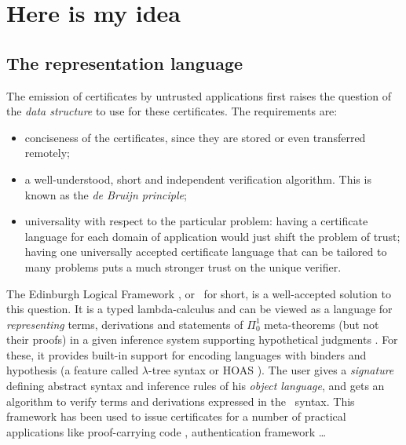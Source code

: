\documentclass[9pt]{sigplanconf}
\begin{document}
\section{Here is my idea}


\subsection{The representation language}

The emission of certificates by untrusted applications first raises
the question of the \emph{data structure} to use for these
certificates. The requirements are:
\begin{itemize}
\item conciseness of the certificates, since they are stored or even
  transferred remotely;
\item a well-understood, short and independent verification algorithm.
  This is known as the \emph{de Bruijn principle};
\item universality with respect to the particular problem: having a
  certificate language for each domain of application would just shift
  the problem of trust; having one universally accepted certificate
  language that can be tailored to many problems puts a much stronger
  trust on the unique verifier.
\end{itemize}

The Edinburgh Logical Framework \cite{harper1993framework}, or \LF\
for short, is a well-accepted solution to this question. It is a typed
lambda-calculus and can be viewed as a language for
\emph{representing} terms, derivations and statements of $\Pi_0^1$
meta-theorems (but not their proofs) in a given inference system
supporting hypothetical judgments \cite{pfenning2001logical}. For
these, it provides built-in support for encoding languages with
binders and hypothesis (a feature called $\lambda$-tree syntax or HOAS
\cite{pfenning1988higher}). The user gives a \emph{signature} defining
abstract syntax and inference rules of his \emph{object language}, and
gets an algorithm to verify terms and derivations expressed in the
\LF\ syntax. This framework has been used to issue certificates for a
number of practical applications like proof-carrying code
\cite{necula1997proof}, authentication framework \cite{appel1999proof}
\ldots %
\end{document}
